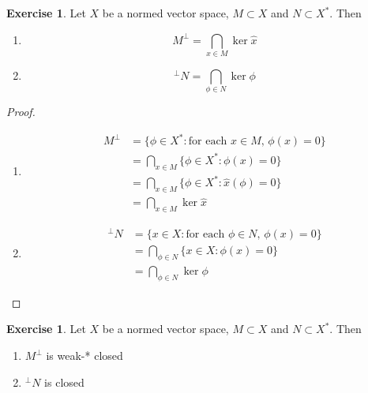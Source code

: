 \documentclass[12pt]{amsart}
\theoremstyle{definition}
\newtheorem{ex}[definition]{Exercise}
\DeclareMathOperator*{\0}{\mbf{0}}
\DeclareMathOperator*{\1}{\mbf{1}}
\begin{document}
	\begin{ex}
	Let $X$ be a normed vector space, $M \subset X$ and $N \subset X^*$. Then 
	\begin{enumerate}
	\item $$M^{\perp} = \bigcap_{x \in M} \ker \hat{x}$$
	\item $$^{\perp}N = \bigcap_{\phi \in N} \ker \phi $$
	\end{enumerate}
	\end{ex}
	
	\begin{proof}\
	\begin{enumerate}
	\item 
	\begin{align*}
	M^{\perp} 
	&= \{\phi \in X^*: \text{for each $x \in M$, $\phi(x) = 0$}\} \\
	&= \bigcap_{x \in M} \{\phi \in X^*: \phi(x) = 0\} \\
	&= \bigcap_{x \in M} \{\phi \in X^*: \hat{x}(\phi) = 0\} \\
	&= \bigcap_{x \in M} \ker \hat{x}
	\end{align*}
	\item 
	\begin{align*}
	^{\perp}N 
	&= \{x \in X: \text{for each $\phi \in N$, $\phi(x) = 0$}\} \\
	&= \bigcap_{\phi \in N} \{x \in X: \phi(x) = 0\} \\
	&= \bigcap_{\phi \in N} \ker \phi
	\end{align*}
	\end{enumerate}
	\end{proof}
	
	\begin{ex}
	Let $X$ be a normed vector space, $M \subset X$ and $N \subset X^*$. Then 
	\begin{enumerate}
	\item $M^{\perp}$ is weak-* closed
	\item $^{\perp} N$ is closed
	\end{enumerate}
	\end{ex}
	
\end{document}
